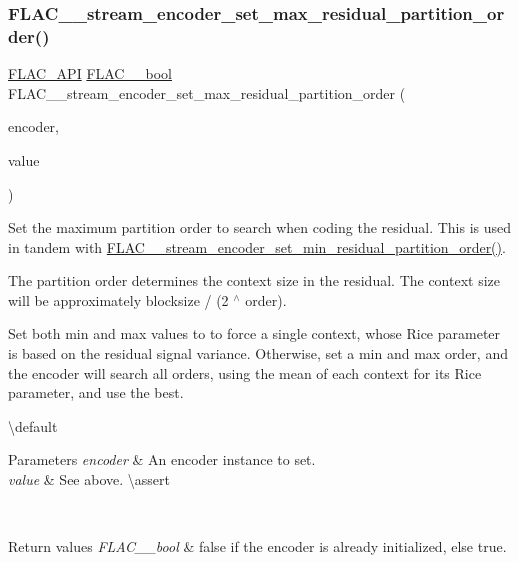 \subsubsection{\texorpdfstring{FLAC\_\_stream\_encoder\_set\_max\_residual\_partition\_order()}{FLAC\_\_stream\_encoder\_set\_max\_residual\_partition\_order()}}
{\footnotesize\ttfamily \mbox{\hyperlink{group__flac__export_ga56ca07df8a23310707732b1c0007d6f5}{F\+L\+A\+C\+\_\+\+A\+PI}} \mbox{\hyperlink{ordinals_8h_a95103469f1cbd78b8cf250194985b34e}{F\+L\+A\+C\+\_\+\+\_\+bool}} F\+L\+A\+C\+\_\+\+\_\+stream\+\_\+encoder\+\_\+set\+\_\+max\+\_\+residual\+\_\+partition\+\_\+order (\begin{DoxyParamCaption}\item[{\mbox{\hyperlink{struct_f_l_a_c_____stream_encoder}{F\+L\+A\+C\+\_\+\+\_\+\+Stream\+Encoder}} $\ast$}]{encoder,  }\item[{unsigned}]{value }\end{DoxyParamCaption})}

Set the maximum partition order to search when coding the residual. This is used in tandem with \mbox{\hyperlink{group__flac__stream__encoder_gae3e2dd204f276d051bf1a118383bfda2}{F\+L\+A\+C\+\_\+\+\_\+stream\+\_\+encoder\+\_\+set\+\_\+min\+\_\+residual\+\_\+partition\+\_\+order()}}.

The partition order determines the context size in the residual. The context size will be approximately {\ttfamily blocksize / (2 $^\wedge$ order)}.

Set both min and max values to {} to force a single context, whose Rice parameter is based on the residual signal variance. Otherwise, set a min and max order, and the encoder will search all orders, using the mean of each context for its Rice parameter, and use the best.

\textbackslash{}default {} 
\begin{DoxyParams}{Parameters}
{\em encoder} & An encoder instance to set. \\
\hline
{\em value} & See above. \textbackslash{}assert 
\begin{DoxyCode}{1}
\end{DoxyCode}
 \\
\hline
\end{DoxyParams}

\begin{DoxyRetVals}{Return values}
{\em F\+L\+A\+C\+\_\+\+\_\+bool} & {\ttfamily false} if the encoder is already initialized, else {\ttfamily true}. \\
\hline
\end{DoxyRetVals}
\mbox{\label{group__flac__stream__encoder_ga67b30b1a67a9274f7708a22154b225f6}} 
